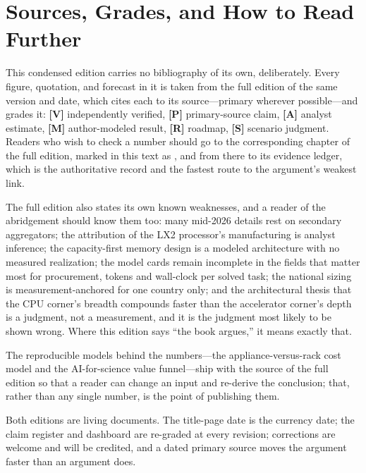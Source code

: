 \chapter*{Sources, Grades, and How to Read Further}

This condensed edition carries no bibliography of its own, deliberately. Every figure, quotation, and forecast in it is taken from the full edition of the same version and date, which cites each to its source---primary wherever possible---and grades it: \textbf{[V]} independently verified, \textbf{[P]} primary-source claim, \textbf{[A]} analyst estimate, \textbf{[M]} author-modeled result, \textbf{[R]} roadmap, \textbf{[S]} scenario judgment. Readers who wish to check a number should go to the corresponding chapter of the full edition, marked in this text as , and from there to its evidence ledger, which is the authoritative record and the fastest route to the argument's weakest link.

The full edition also states its own known weaknesses, and a reader of the abridgement should know them too: many mid-2026 details rest on secondary aggregators; the attribution of the LX2 processor's manufacturing is analyst inference; the capacity-first memory design is a modeled architecture with no measured realization; the model cards remain incomplete in the fields that matter most for procurement, tokens and wall-clock per solved task; the national sizing is measurement-anchored for one country only; and the architectural thesis that the CPU corner's breadth compounds faster than the accelerator corner's depth is a judgment, not a measurement, and it is the judgment most likely to be shown wrong. Where this edition says ``the book argues,'' it means exactly that.

The reproducible models behind the numbers---the appliance-versus-rack cost model and the AI-for-science value funnel---ship with the source of the full edition so that a reader can change an input and re-derive the conclusion; that, rather than any single number, is the point of publishing them.

Both editions are living documents. The title-page date is the currency date; the claim register and dashboard are re-graded at every revision; corrections are welcome and will be credited, and a dated primary source moves the argument faster than an argument does.
